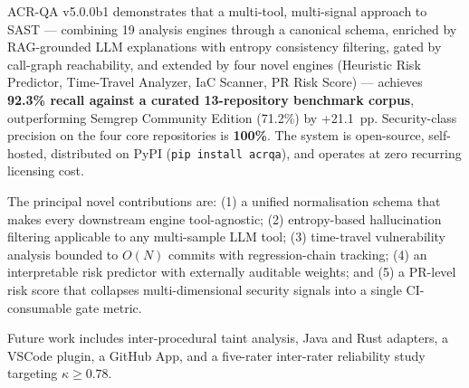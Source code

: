 \documentclass[conference]{IEEEtran}
\begin{document}
ACR-QA v5.0.0b1 demonstrates that a multi-tool, multi-signal approach to SAST — combining 19 analysis engines through a canonical schema, enriched by RAG-grounded LLM explanations with entropy consistency filtering, gated by call-graph reachability, and extended by four novel engines (Heuristic Risk Predictor, Time-Travel Analyzer, IaC Scanner, PR Risk Score) — achieves \textbf{92.3\% recall against a curated 13-repository benchmark corpus}, outperforming Semgrep Community Edition (71.2\%) by +21.1~pp. Security-class precision on the four core repositories is \textbf{100\%}. The system is open-source, self-hosted, distributed on PyPI (\texttt{pip install acrqa}), and operates at zero recurring licensing cost.

The principal novel contributions are: (1) a unified normalisation schema that makes every downstream engine tool-agnostic; (2) entropy-based hallucination filtering applicable to any multi-sample LLM tool; (3) time-travel vulnerability analysis bounded to $O(N)$ commits with regression-chain tracking; (4) an interpretable risk predictor with externally auditable weights; and (5) a PR-level risk score that collapses multi-dimensional security signals into a single CI-consumable gate metric.

Future work includes inter-procedural taint analysis, Java and Rust adapters, a VSCode plugin, a GitHub App, and a five-rater inter-rater reliability study targeting $\kappa \geq 0.78$.



\end{document}
